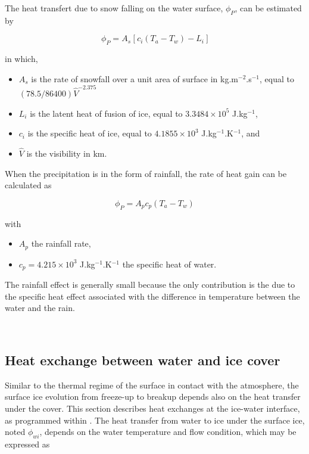 The heat transfert due to snow falling on the water surface, $\phi_P$, can be estimated by

\begin{equation} \label{eq:phip}
\phi_P = A_s\ \Big[\ c_i( T_a-T_w ) -L_i \ \Big]
\end{equation}

in which,
\begin{itemize}
	\item $A_s$ is the rate of snowfall over a unit area of surface in kg.m$^{-2}$.s$^{-1}$, equal to $(78.5/86400)\hat{V}^{-2.375}$
	\item $L_i$ is the latent heat of fusion of ice, equal to $3.3484 \times 10^5$ J.kg$^{-1}$,
	\item $c_i$ is the specific heat of ice, equal to $4.1855\times10^3$ J.kg$^{-1}$.K$^{-1}$, and
	\item $\hat{V}$ is the visibility in km.
\end{itemize}

When the precipitation is in the form of rainfall, the rate of heat gain can be calculated as

\begin{equation} \label{eq:phipbis}
\phi_P=A_p c_p(T_a-T_w)
\end{equation}

with

\begin{itemize}
	\item $A_p$ the rainfall rate,
	\item $c_p=4.215\times10^3$ J.kg$^{-1}$.K$^{-1}$ the specific heat of water.
\end{itemize}

The rainfall effect is generally small because the only contribution is the due to the specific heat effect associated with the difference in temperature between the water and the rain.

~\newline
\subsection{Heat exchange between water and ice cover}
\label{heat_exchanges_icover_and_water}

Similar to the thermal regime of the surface in contact with the atmosphere, the surface ice evolution from freeze-up to breakup depends also on the heat transfer under the cover. This section describes heat exchanges at the ice-water interface, as programmed within \khione.
The heat transfer from water to ice under the surface ice, noted $\phi_{wi}$, depends on the water temperature and flow condition, which may be expressed as

